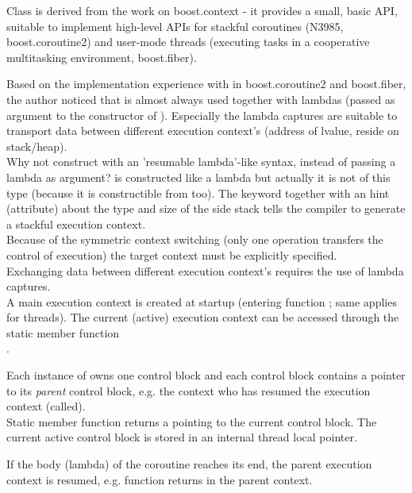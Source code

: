 Class \ectx is derived from the work on boost.context\cite{bcontext} - it
provides a small, basic API, suitable to implement high-level APIs for stackful
coroutines (N3985\cite{N3985}, boost.coroutine2\cite{bcoroutine2}) and user-mode
threads (executing tasks in a cooperative multitasking environment,
boost.fiber\cite{bfiber}).

Based on the implementation experience with  in
boost.coroutine2\cite{bcoroutine2} and boost.fiber\cite{bfiber}, the author
noticed that  is almost always used together with lambdas
(passed as argument to the constructor of ). Especially
the lambda captures are suitable to transport data between different execution
context's (address of lvalue, reside on stack/heap).\\
Why not construct \ectx with an 'resumable lambda'-like syntax, instead of
passing a lambda as argument? \ectx is constructed like a lambda but actually it
is not of this type (because it is constructible from \ectxcurrent too).
The keyword \resumable together with an hint (attribute) about the type and size
of the side stack tells the compiler to generate a stackful execution context.\\
Because of the symmetric context switching (only one operation transfers the
control of execution) the target context must be explicitly specified.\\
Exchanging data between different execution context's requires the use of lambda
captures.\\
A main execution context is created at startup (entering function \main; same
applies for threads). The current (active) execution context can be accessed
through the static member function\\
\ectxcurrent.

Each instance of \ectx owns one control block and each control block contains a
pointer to its \emph{parent} control block, e.g. the context who has resumed the
execution context (\ectxop called).\\
Static member function \ectxcurrent returns a \ectx pointing to the current
control block. The current active control block is stored in an internal thread
local pointer.

If the body (lambda) of the coroutine reaches its end, the parent execution
context is resumed, e.g. function \ectxop returns in the parent context.

